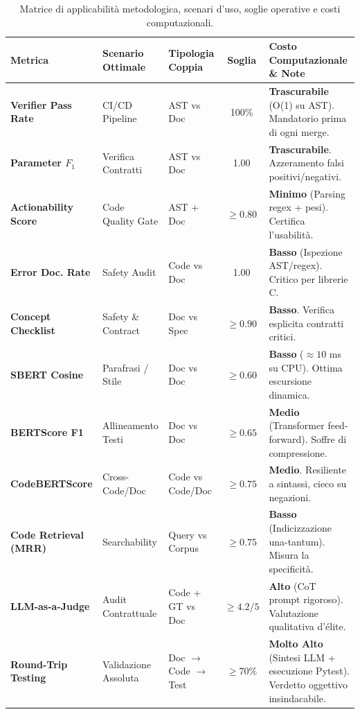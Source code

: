 \begin{table}[htbp]
\centering
\small
\caption{Matrice di applicabilità metodologica, scenari d'uso, soglie operative e costi computazionali.}
\label{tab:applicability_matrix}
\begin{tabularx}{\textwidth}{p{3.2cm}p{2.6cm}p{2.4cm}cX}
\toprule
\textbf{Metrica} & \textbf{Scenario Ottimale} & \textbf{Tipologia Coppia} & \textbf{Soglia} & \textbf{Costo Computazionale \& Note} \\
\midrule
\textbf{Verifier Pass Rate} & CI/CD Pipeline & AST vs Doc & 100\% & \textbf{Trascurabile} (O(1) su AST). Mandatorio prima di ogni merge. \\
\textbf{Parameter $F_1$} & Verifica Contratti & AST vs Doc & 1.00 & \textbf{Trascurabile}. Azzeramento falsi positivi/negativi. \\
\textbf{Actionability Score} & Code Quality Gate & AST + Doc & $\ge 0.80$ & \textbf{Minimo} (Parsing regex + pesi). Certifica l'usabilità. \\
\textbf{Error Doc. Rate} & Safety Audit & Code vs Doc & 1.00 & \textbf{Basso} (Ispezione AST/regex). Critico per librerie C. \\
\textbf{Concept Checklist} & Safety \& Contract & Doc vs Spec & $\ge 0.90$ & \textbf{Basso}. Verifica esplicita contratti critici. \\
\textbf{SBERT Cosine} & Parafrasi / Stile & Doc vs Doc & $\ge 0.60$ & \textbf{Basso} ($\approx 10$ ms su CPU). Ottima escursione dinamica. \\
\textbf{BERTScore F1} & Allineamento Testi & Doc vs Doc & $\ge 0.65$ & \textbf{Medio} (Transformer feed-forward). Soffre di compressione. \\
\textbf{CodeBERTScore} & Cross-Code/Doc & Code vs Code/Doc & $\ge 0.75$ & \textbf{Medio}. Resiliente a sintassi, cieco su negazioni. \\
\textbf{Code Retrieval (MRR)} & Searchability & Query vs Corpus & $\ge 0.75$ & \textbf{Basso} (Indicizzazione una-tantum). Misura la specificità. \\
\textbf{LLM-as-a-Judge} & Audit Contrattuale & Code + GT vs Doc & $\ge 4.2 / 5$ & \textbf{Alto} (CoT prompt rigoroso). Valutazione qualitativa d'élite. \\
\textbf{Round-Trip Testing} & Validazione Assoluta & Doc $\to$ Code $\to$ Test & $\ge 70\%$ & \textbf{Molto Alto} (Sintesi LLM + esecuzione Pytest). Verdetto oggettivo insindacabile. \\
\bottomrule
\end{tabularx}
\end{table}
